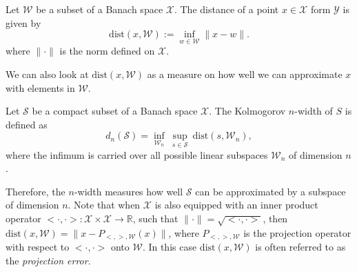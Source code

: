 \begin{definition}
Let $\mathcal W$ be a subset of a Banach space $\mathcal X$. The distance of a point $x\in \mathcal X$ form $\mathcal Y$ is given by
\begin{equation}  \label{eq:3.3}
	\text{dist}(x,\mathcal W) := \inf_{w\in \mathcal W} \| x-w \|.
\end{equation}
where $\|\cdot\|$ is the norm defined on $\mathcal X$.
\end{definition}
We can also look at $\text{dist}(x,\mathcal W)$ as a measure on how well we can approximate $x$ with elements in $\mathcal W$.
\begin{definition}
Let $\mathcal S$ be a compact subset of a Banach space $\mathcal X$. The Kolmogorov $n$-width of $S$ is defined as
\begin{equation} \label{eq:3.4}
	d_n(\mathcal S) = \inf_{\mathcal W_n} \ \sup_{s\in \mathcal S} \ \text{dist}(s, \mathcal W_n),
\end{equation}
where the infimum is carried over all possible linear subspaces $\mathcal W_n$ of dimension $n$.
\end{definition}
Therefore, the $n$-width measures how well $\mathcal S$ can be approximated by a subspace of dimension $n$. Note that when $\mathcal X$ is also equipped with an inner product operator $<\cdot , \cdot> :\mathcal X \times \mathcal X \to \mathbb R $, such that $\| \cdot \| = \sqrt{<\cdot , \cdot>}$, then $\text{dist}(x,\mathcal W) = \| x - P_{<,>,\mathcal W}(x) \|$, where $P_{<,>,\mathcal W}$ is the projection operator with respect to $<\cdot,\cdot>$ onto $\mathcal W$. In this case $\text{dist}(x,\mathcal W)$ is often referred to as the \emph{projection error}.

